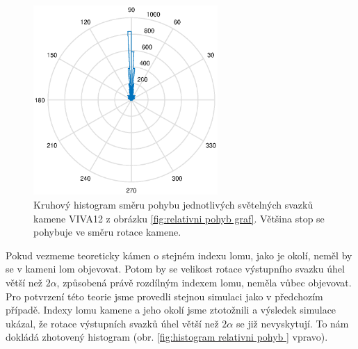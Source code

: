 \begin{figure}[h!]
\begin{center}
\includegraphics[width = 7cm]{figures/kruhovy_histogram.eps}
\end{center}
\caption{Kruhový histogram směru pohybu jednotlivých světelných svazků kamene VIVA12 z obrázku \ref{fig:relativni pohyb graf}. Většina stop se pohybuje ve směru rotace kamene.}
\label{fig:kruhovy histogram}
\end{figure}

Pokud vezmeme teoreticky kámen o stejném indexu lomu, jako je okolí, neměl by se v kameni lom objevovat. Potom by se velikost rotace výstupního svazku úhel větší než $2\alpha$, způsobená právě rozdílným indexem lomu,  neměla vůbec objevovat. Pro potvrzení této teorie jsme provedli stejnou simulaci jako v předchozím případě. Indexy lomu kamene a jeho okolí jsme ztotožnili a výsledek simulace ukázal, že rotace výstupních svazků úhel větší než $2\alpha$ se již nevyskytují. To nám dokládá zhotovený histogram (obr. \ref{fig:histogram relativni pohyb } vpravo).


